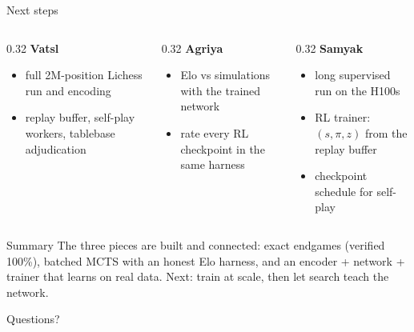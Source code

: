 \documentclass[aspectratio=169, 10pt]{beamer}
\newcommand{\track}[2]{{\color{#1}\textbf{#2}}}
\begin{document}
\begin{frame}{Next steps}
  \begin{columns}[T]
    \begin{column}{0.32\textwidth}
      \track{acDP}{Vatsl}
      \begin{itemize}
        \small
        \item full 2M-position Lichess run and encoding
        \item replay buffer, self-play workers, tablebase adjudication
      \end{itemize}
    \end{column}
    \begin{column}{0.32\textwidth}
      \track{acSearch}{Agriya}
      \begin{itemize}
        \small
        \item Elo vs simulations with the trained network
        \item rate every RL checkpoint in the same harness
      \end{itemize}
    \end{column}
    \begin{column}{0.32\textwidth}
      \track{acNet}{Samyak}
      \begin{itemize}
        \small
        \item long supervised run on the H100s
        \item RL trainer: $(s, \pi, z)$ from the replay buffer
        \item checkpoint schedule for self-play
      \end{itemize}
    \end{column}
  \end{columns}
  \bigskip
  \begin{block}{Summary}
    The three pieces are built and connected: exact endgames (verified 100\%), batched MCTS
    with an honest Elo harness, and an encoder + network + trainer that learns on real data.
    Next: train at scale, then let search teach the network.
  \end{block}
\end{frame}

\begin{frame}[standout]
  Questions?
\end{frame}
\end{document}
